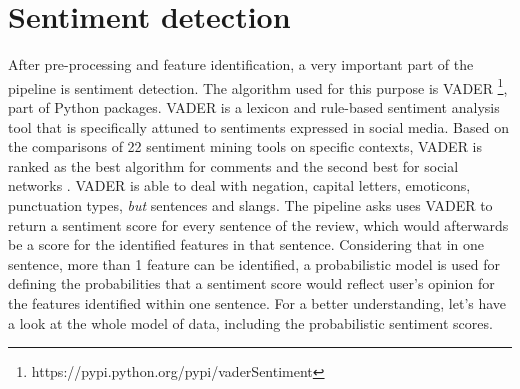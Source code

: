\section{Sentiment detection}
After pre-processing and feature identification, a very important part of the pipeline is sentiment detection. The algorithm used for this purpose is VADER \footnote{https://pypi.python.org/pypi/vaderSentiment}, part of Python packages. VADER is a lexicon and rule-based sentiment analysis tool that is specifically attuned to sentiments expressed in social media. Based on the comparisons of 22 sentiment mining tools on specific contexts, VADER is ranked as the best algorithm for comments and the second best for social networks \cite{ribeiro2015benchmark}.
VADER is able to deal with negation, capital letters, emoticons, punctuation types, \textit{but} sentences and slangs. The pipeline asks uses VADER to return a sentiment score for every sentence of the review, which would afterwards be a score for the identified features in that sentence. Considering that in one sentence, more than 1 feature can be identified, a probabilistic model is used for defining the probabilities that a sentiment score would reflect user's opinion for the features identified within one sentence. For a better understanding, let's have a look at the whole model of data, including the probabilistic sentiment scores.

